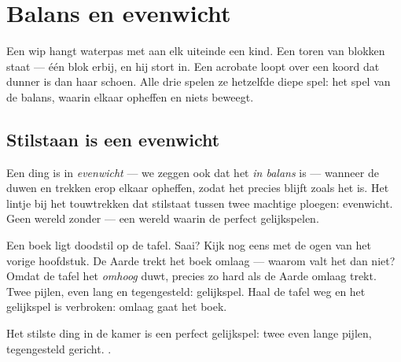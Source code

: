 \chapter{Balans en evenwicht}\label{ch:g2:balance-equilibrium}

Een wip hangt waterpas met aan elk uiteinde een kind. Een toren van
blokken staat --- één blok erbij, en hij stort in. Een acrobate loopt
over een koord dat dunner is dan haar schoen. Alle drie spelen ze
hetzelfde diepe spel: het spel van de balans, waarin  elkaar
opheffen en niets beweegt.

\section{Stilstaan is een evenwicht}

\begin{definition}[Evenwicht]\label{def:g2:balance-equilibrium:equilibrium}
Een ding is in \emph{evenwicht} --- we zeggen ook dat
het \emph{in balans} is --- wanneer de duwen en
trekken erop elkaar opheffen, zodat het precies blijft zoals het is.
Het lintje bij het touwtrekken dat stilstaat tussen twee machtige
ploegen: evenwicht. Geen wereld zonder  --- een wereld waarin de
 perfect gelijkspelen.
\end{definition}

\begin{example}\label{ex:g2:balance-equilibrium:book}
Een boek ligt doodstil op de tafel. Saai? Kijk nog eens met de ogen
van het vorige hoofdstuk. De Aarde trekt het boek omlaag --- waarom
valt het dan niet? Omdat de tafel het \emph{omhoog} duwt, precies zo
hard als de Aarde omlaag trekt. Twee pijlen, even lang en
tegengesteld: gelijkspel. Haal de tafel weg en het gelijkspel is
verbroken: omlaag gaat het boek.
\end{example}

\begin{omfigure}

{\small Het stilste ding in de kamer is een perfect gelijkspel: twee
even lange pijlen, tegengesteld gericht. .}
\end{omfigure}

